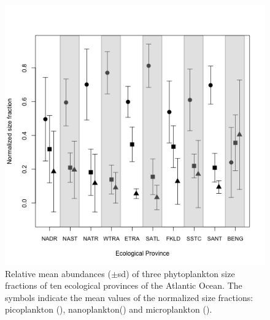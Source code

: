 \begin{figure}
\centering
\includegraphics[trim = 0mm 0mm 0mm 0mm, clip, width=0.9\linewidth]{./Chp2-Pre/amt_MeanSDProvinces.png}
\caption[Scheme]{\small {Relative mean abundances ($\pm$sd) of three phytoplankton size fractions of ten ecological provinces of the Atlantic Ocean. The symbols indicate the mean values of the normalized size fractions: picoplankton (), nanoplankton() and microplankton ().}}
\label{means}
\end{figure}

